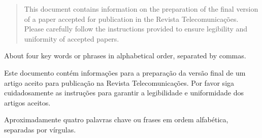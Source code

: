 \begin{abstract}
   This document contains information on the preparation of the final version of a paper accepted for publication in the Revista Telecomunicações. Please carefully follow the instructions provided to ensure legibility and uniformity of accepted papers.
\end{abstract}

\begin{keywords}
    About four key words or phrases in alphabetical order, separated by commas.
\end{keywords}

\begin{resumo}
   Este documento contém informações para a preparação da versão final de um artigo aceito para publicação na Revista Telecomunicações. Por favor siga cuidadosamente as instruções para garantir a legibilidade e uniformidade dos artigos aceitos.
\end{resumo}

\begin{palavrasChaves}
    Aproximadamente quatro palavras chave ou frases em ordem alfabética, separadas por vírgulas.
\end{palavrasChaves}
